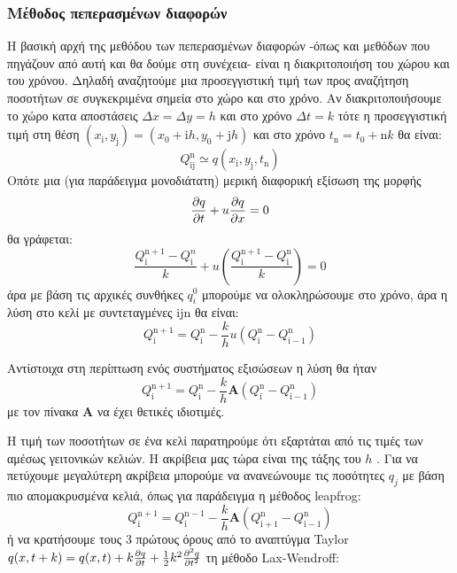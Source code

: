 \subsubsection{Μέθοδος πεπερασμένων διαφορών}
Η βασική αρχή της μεθόδου των πεπερασμένων διαφορών -όπως και μεθόδων που πηγάζουν από αυτή και θα δούμε στη συνέχεια- είναι η διακριτοποιήση του χώρου και του χρόνου. Δηλαδή αναζητούμε μια προσεγγιστική τιμή των προς αναζήτηση ποσοτήτων σε συγκεκριμένα σημεία στο χώρο και στο χρόνο. Αν διακριτοποιήσουμε το χώρο κατα αποστάσεις $\Delta x=\Delta y = h$ και στο χρόνο $\Delta t=k$ τότε η προσεγγιστική τιμή στη θέση $(x_\mathrm{i},y_\mathrm{j})=(x_0+\mathrm{i}h,y_0+\mathrm{j}h)$ και στο χρόνο $t_\mathrm{n}=t_0+\mathrm{n}k$ θα είναι:
\begin{equation}
Q_{\mathrm{ij}}^\mathrm{n }\simeq q(x_\mathrm{i},y_\mathrm{j},t_\mathrm{n})
\end{equation}
Οπότε μια (για παράδειγμα μονοδιάτατη) μερική διαφορική εξίσωση της μορφής
\begin{equation}
\pdv{q}{t}+u\pdv{q}{x}=0
\end{equation} 
θα γράφεται:
\begin{equation}
\frac{Q_\mathrm{i}^\mathrm{n+1}-Q_\mathrm{i}^n }{k} + u \left( \frac{Q_\mathrm{i}^\mathrm{n+1}-Q_\mathrm{i}^\mathrm{n} }{k}  \right) =0
\end{equation}
άρα με βάση τις αρχικές συνθήκες $q_i^0$ μπορούμε να ολοκληρώσουμε στο χρόνο, άρα η λύση στο κελί με συντεταγμένες $\mathrm{ijn}$ θα είναι:
\begin{equation}
Q_{\mathrm{i}}^\mathrm{n+1} = Q_{\mathrm{i}}^\mathrm{n} -\frac{k}{h} u \left( Q_\mathrm{i}^\mathrm{n} - Q_\mathrm{i-1}^\mathrm{n} \right)
\end{equation} 

Αντίστοιχα στη περίπτωση ενός συστήματος εξισώσεων η λύση θα ήταν
\begin{equation}
Q_{\mathrm{i}}^\mathrm{n+1} = Q_{\mathrm{i}}^\mathrm{n} -\frac{k}{h} \mathbf{Α} \left( Q_\mathrm{i}^\mathrm{n} - Q_\mathrm{i-1}^\mathrm{n} \right)
\end{equation} 
με τον πίνακα $\mathbf{Α}$ να έχει θετικές ιδιοτιμές. 

Η τιμή των ποσοτήτων σε ένα κελί παρατηρούμε ότι εξαρτάται από τις τιμές των αμέσως γειτονικών κελιών. Η ακρίβεια μας τώρα είναι της τάξης του $h$ . Για να πετύχουμε μεγαλύτερη ακρίβεια μπορούμε να ανανεώνουμε τις ποσότητες $q_j$ με βάση πιο απομακρυσμένα κελιά, όπως για παράδειγμα η μέθοδος leapfrog:
\begin{equation}
Q_{\mathrm{i}}^\mathrm{n+1} = Q_{\mathrm{i}}^\mathrm{n-1} -\frac{k}{h} \mathbf{Α} \left( Q_\mathrm{i+1}^\mathrm{n} - Q_\mathrm{i-1}^\mathrm{n} \right)
\end{equation} 
ή να κρατήσουμε τους 3 πρώτους όρους από το αναπτύγμα Taylor $q(x,t+k)=q(x,t)+k\pdv{q}{t}(x,t)+\frac{1}{2}k^2 \pdv[2]{q}{t}$ τη μέθοδο Lax-Wendroff:
 
